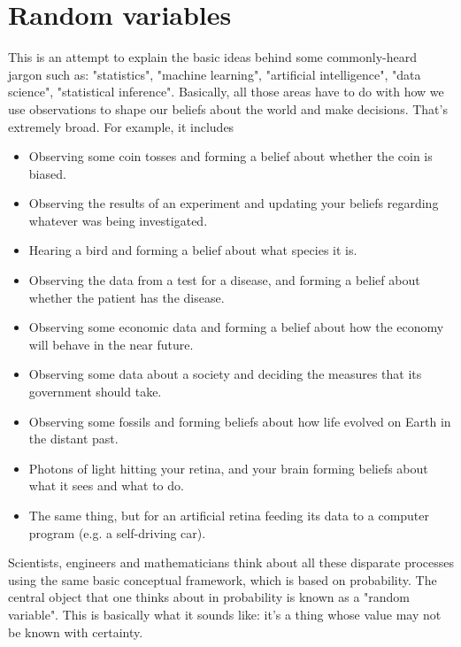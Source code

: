 \section{Random variables}

This is an attempt to explain the basic ideas behind some commonly-heard jargon such as: "statistics", "machine learning", "artificial intelligence", "data science", "statistical inference". Basically, all those areas have to do with how we use observations to shape our beliefs about the world and make decisions. That's extremely broad. For example, it includes
\begin{itemize}
\item Observing some coin tosses and forming a belief about whether the coin is biased.
\item Observing the results of an experiment and updating your beliefs regarding whatever was being investigated.
\item Hearing a bird and forming a belief about what species it is.
\item Observing the data from a test for a disease, and forming a belief about whether the patient has the disease.
\item Observing some economic data and forming a belief about how the economy will behave in the near future.
\item Observing some data about a society and deciding the measures that its government should take.
\item Observing some fossils and forming beliefs about how life evolved on Earth in the distant past.
\item Photons of light hitting your retina, and your brain forming beliefs about what it sees and what to do.
\item The same thing, but for an artificial retina feeding its data to a computer program (e.g. a self-driving car).
\end{itemize}
Scientists, engineers and mathematicians think about all these disparate processes using the same basic conceptual framework, which is based on probability. The central object that one thinks about in probability is known as a "random variable". This is basically what it sounds like: it's a thing whose value may not be known with certainty.

